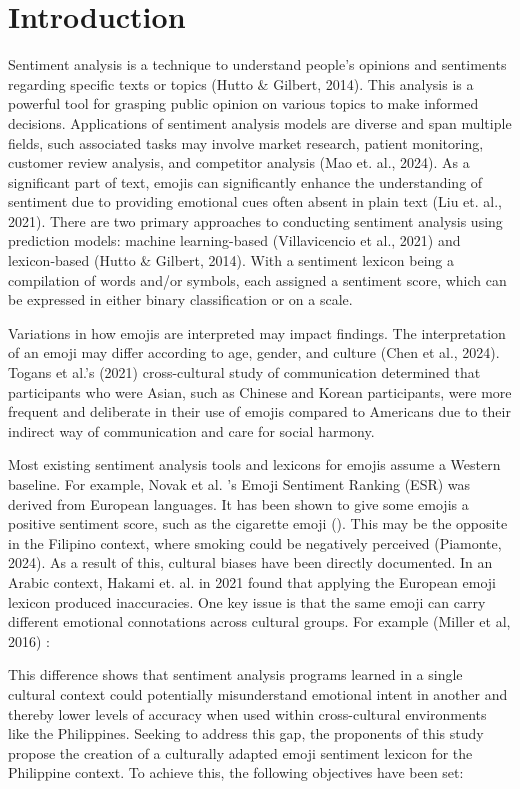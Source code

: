 \setcounter{page}{1}

\chapter{Introduction}
Sentiment analysis is a technique to understand people's opinions and sentiments regarding specific texts or topics (Hutto \& Gilbert, 2014). This analysis is a powerful tool for grasping public opinion on various topics to make informed decisions. Applications of sentiment analysis models are diverse and span multiple fields, such  associated tasks may involve market research, patient monitoring, customer review analysis, and competitor analysis (Mao et. al., 2024). As a significant part of text, emojis can significantly enhance the understanding of sentiment due to providing emotional cues often absent in plain text (Liu et. al., 2021). There are two primary approaches to conducting sentiment analysis using prediction models: machine learning-based (Villavicencio et al., 2021) and lexicon-based (Hutto \& Gilbert, 2014). With a sentiment lexicon being a compilation of words and/or symbols, each assigned a sentiment score, which can be expressed in either binary classification or on a scale.

Variations in how emojis are interpreted may impact findings. The interpretation of an emoji may differ according to age, gender, and culture (Chen et al., 2024). Togans et al.'s (2021) cross-cultural study of communication determined that participants who were Asian, such as Chinese and Korean participants, were more frequent and deliberate in their use of emojis compared to Americans due to their indirect way of communication and care for social harmony.

Most existing sentiment analysis tools and lexicons for emojis assume a Western baseline. For example, Novak et al. 's Emoji Sentiment Ranking (ESR) was derived from European languages. It has been shown to give some emojis a positive sentiment score, such as the cigarette emoji (). This may be the opposite in the Filipino context, where smoking could be negatively perceived (Piamonte, 2024). As a result of this, cultural biases have been directly documented. In an Arabic context, Hakami et. al. in 2021 found that applying the European emoji lexicon produced inaccuracies. One key issue is that the same emoji can carry different emotional connotations across cultural groups. For example (Miller et al, 2016) :

This difference shows that sentiment analysis programs learned in a single cultural context could potentially misunderstand emotional intent in another and thereby lower levels of accuracy when used within cross-cultural environments like the Philippines.
Seeking to address this gap, the proponents of this study propose the creation of a culturally adapted emoji sentiment lexicon for the Philippine context. To achieve this, the following objectives have been set:

